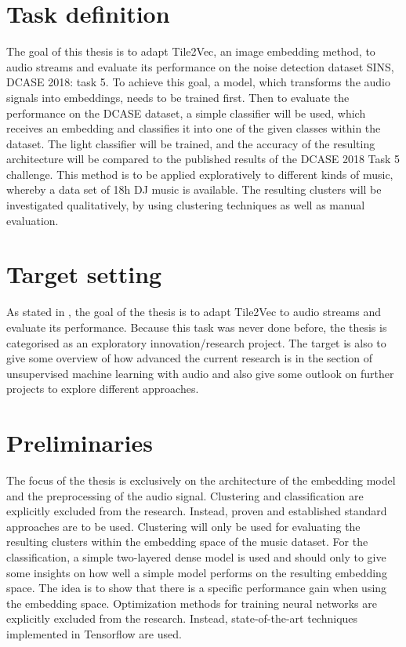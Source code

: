 \section{Task definition}
\label{sub:Task-Definition}
The goal of this thesis is to adapt Tile2Vec, an image embedding method, to audio streams and evaluate its performance on the noise detection dataset \flqq SINS, DCASE 2018: task 5\frqq. 
\newline
\newline
To achieve this goal, a model, which transforms the audio signals into embeddings, needs to be trained first. Then to evaluate the performance on the DCASE dataset, a simple classifier will be used, which receives an embedding and classifies it into one of the given classes within the dataset. The light classifier will be trained, and the accuracy of the resulting architecture will be compared to the published results of the DCASE 2018 Task 5 challenge.
\newline
\newline
This method is to be applied exploratively to different kinds of music, whereby a data set of 18h DJ music is available. The resulting clusters will be investigated qualitatively, by using clustering techniques as well as manual evaluation.

\section{Target setting}
\label{sub:Target-Setting}
As stated in , the goal of the thesis is to adapt Tile2Vec to audio streams and evaluate its performance. Because this task was never done before, the thesis is categorised as an exploratory innovation/research project. The target is also to give some overview of how advanced the current research is in the section of unsupervised machine learning with audio and also give some outlook on further projects to explore different approaches.

\section{Preliminaries}
\label{sub:Preliminaries}
The focus of the thesis is exclusively on the architecture of the embedding model and the preprocessing of the audio signal. Clustering and classification are explicitly excluded from the research. Instead, proven and established standard approaches are to be used.
\newline
\newline
Clustering will only be used for evaluating the resulting clusters within the embedding space of the music dataset. For the classification, a simple two-layered dense model is used and should only to give some insights on how well a simple model performs on the resulting embedding space. The idea is to show that there is a specific performance gain when using the embedding space.
\newline
\newline
Optimization methods for training neural networks are explicitly excluded from the research. Instead, state-of-the-art techniques implemented in Tensorflow are used.
